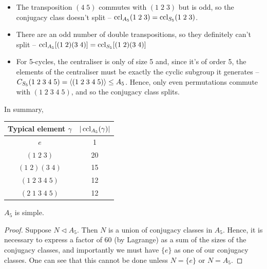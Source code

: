 \documentclass{../template/note}
\begin{document}
    \begin{example}[Conjugacy in \(A_5\)]
        \begin{itemize}
            \item The transposition \((4 \; 5)\) commutes with \((1 \; 2 \; 3)\) but is odd, so the conjugacy class doesn't split -- \(\operatorname{ccl}_{A_5}(1 \; 2 \; 3) = \operatorname{ccl}_{S_5}(1 \; 2 \; 3)\).
            \item There are an odd number of double transpositions, so they definitely can't split -- \(\operatorname{ccl}_{A_5}[(1 \; 2)(3 \; 4)] = \operatorname{ccl}_{S_5}[(1 \; 2)(3 \; 4)]\)
            \item For 5-cycles, the centraliser is only of size 5 and, since it's of order 5, the elements of the centraliser must be exactly the cyclic subgroup it generates -- \(C_{S_5}(1 \; 2 \; 3 \; 4 \; 5) = \left \langle (1 \; 2 \; 3 \; 4 \; 5) \right \rangle \leq A_5\). Hence, only even permutations commute with \((1 \; 2 \; 3 \; 4 \; 5)\), and so the conjugacy class splits.
        \end{itemize} \vspace{10pt}
        In summary,
        \begin{center}
            \begin{tabular}{c | c}
                Typical element \(\gamma\) & \(|\operatorname{ccl}_{A_5}(\gamma)|\) \\
                \hline
                \(e\) & 1 \\
                \((1 \; 2 \; 3)\) & 20 \\
                \((1 \; 2)(3 \; 4)\) & 15 \\
                \((1 \; 2 \; 3 \; 4 \; 5)\) & 12 \\
                \((2 \; 1 \; 3 \; 4 \; 5)\) & 12
            \end{tabular}
        \end{center}
    \end{example}
    
    \begin{theorem}[\(A_5\) is simple]
        \(A_5\) is simple.
    \end{theorem}
    
    \begin{proof}
        Suppose \(N \triangleleft A_5\). Then \(N\) is a union of conjugacy classes in \(A_5\). Hence, it is necessary to express a factor of 60 (by Lagrange) as a sum of the sizes of the conjugacy classes, and importantly we must have \(\{e\}\) as one of our conjugacy classes. One can see that this cannot be done unless \(N = \{e\}\) or \(N = A_5\).
    \end{proof}
    
\end{document}
